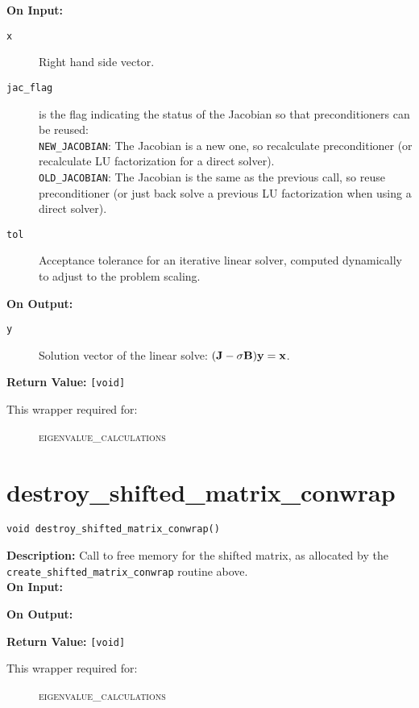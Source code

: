 {\bf On Input:}
\begin{description}
\item[\texttt{x}] Right hand side vector.
\item[\texttt{jac\_flag}] is the flag indicating the status of the Jacobian so that preconditioners can be reused: \\
\texttt{NEW\_JACOBIAN}:  The Jacobian is a new one, so recalculate preconditioner (or recalculate LU factorization for a direct solver). \\
\texttt{OLD\_JACOBIAN}:  The Jacobian is the same as the previous call, so reuse preconditioner (or just back solve a previous LU factorization when using a direct solver). 
\item[\texttt{tol}] Acceptance tolerance for an iterative linear solver, computed dynamically to adjust to the problem scaling.
\end{description}

{\bf On Output:}
\begin{description}
\item[\texttt{y}] Solution vector of the linear solve: $({\bf J} - \sigma {\bf B}) {\bf y} = {\bf x}$.
\end{description}

{\bf Return Value:} \texttt{[void]} 

\begin{description}
\item[This wrapper required for:]
\textsc{eigenvalue\_calculations}
\end{description}

\section{destroy\_shifted\_matrix\_conwrap}

\texttt{void destroy\_shifted\_matrix\_conwrap()}

{\bf Description:}  Call to free memory for the shifted matrix, as allocated
by the \texttt{create\_shifted\_matrix\_conwrap} routine above.\\

{\bf On Input:}

{\bf On Output:}

{\bf Return Value:} \texttt{[void]} 

\begin{description}
\item[This wrapper required for:]
\textsc{eigenvalue\_calculations}
\end{description}

